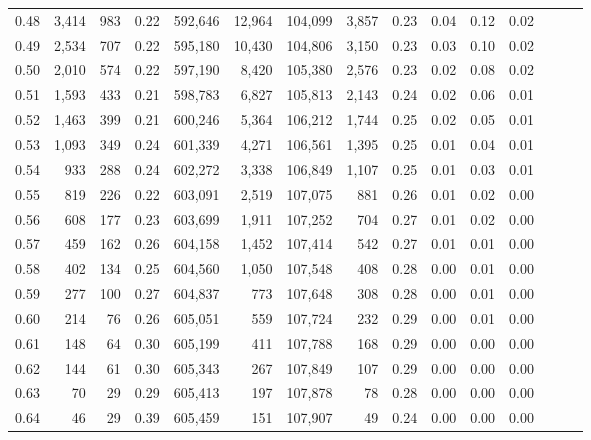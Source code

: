 \begin{tabular}{rrrrrrrrrrrrrrr}
0.48 &    3,414 &     983 &  0.22 &  592,646 &   12,964 &  104,099 &    3,857 &  0.23 &  0.04 &  0.12 &      0.02 \\
0.49 &    2,534 &     707 &  0.22 &  595,180 &   10,430 &  104,806 &    3,150 &  0.23 &  0.03 &  0.10 &      0.02 \\
0.50 &    2,010 &     574 &  0.22 &  597,190 &    8,420 &  105,380 &    2,576 &  0.23 &  0.02 &  0.08 &      0.02 \\
0.51 &    1,593 &     433 &  0.21 &  598,783 &    6,827 &  105,813 &    2,143 &  0.24 &  0.02 &  0.06 &      0.01 \\
0.52 &    1,463 &     399 &  0.21 &  600,246 &    5,364 &  106,212 &    1,744 &  0.25 &  0.02 &  0.05 &      0.01 \\
0.53 &    1,093 &     349 &  0.24 &  601,339 &    4,271 &  106,561 &    1,395 &  0.25 &  0.01 &  0.04 &      0.01 \\
0.54 &      933 &     288 &  0.24 &  602,272 &    3,338 &  106,849 &    1,107 &  0.25 &  0.01 &  0.03 &      0.01 \\
0.55 &      819 &     226 &  0.22 &  603,091 &    2,519 &  107,075 &      881 &  0.26 &  0.01 &  0.02 &      0.00 \\
0.56 &      608 &     177 &  0.23 &  603,699 &    1,911 &  107,252 &      704 &  0.27 &  0.01 &  0.02 &      0.00 \\
0.57 &      459 &     162 &  0.26 &  604,158 &    1,452 &  107,414 &      542 &  0.27 &  0.01 &  0.01 &      0.00 \\
0.58 &      402 &     134 &  0.25 &  604,560 &    1,050 &  107,548 &      408 &  0.28 &  0.00 &  0.01 &      0.00 \\
0.59 &      277 &     100 &  0.27 &  604,837 &      773 &  107,648 &      308 &  0.28 &  0.00 &  0.01 &      0.00 \\
0.60 &      214 &      76 &  0.26 &  605,051 &      559 &  107,724 &      232 &  0.29 &  0.00 &  0.01 &      0.00 \\
0.61 &      148 &      64 &  0.30 &  605,199 &      411 &  107,788 &      168 &  0.29 &  0.00 &  0.00 &      0.00 \\
0.62 &      144 &      61 &  0.30 &  605,343 &      267 &  107,849 &      107 &  0.29 &  0.00 &  0.00 &      0.00 \\
0.63 &       70 &      29 &  0.29 &  605,413 &      197 &  107,878 &       78 &  0.28 &  0.00 &  0.00 &      0.00 \\
0.64 &       46 &      29 &  0.39 &  605,459 &      151 &  107,907 &       49 &  0.24 &  0.00 &  0.00 &      0.00 \\

\end{tabular}
